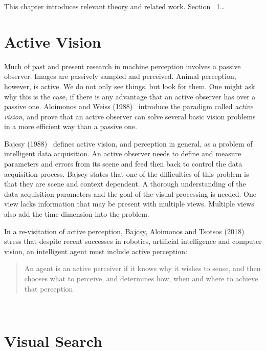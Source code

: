 This chapter introduces relevant theory and related work.
Section ~\ref{}\dots

\section{Active Vision}


Much of past and present research in machine perception involves a passive observer.
Images are passively sampled and perceived.
Animal perception, however, is active.
We do not only see things, but look for them.
One might ask why this is the case, if there is any advantage that an active observer has over a passive one.
Aloimonos and Weiss (1988)~\cite{aloimonos_active_1988} introduce the paradigm called \textit{active vision}, and prove that an active observer can solve several basic vision problems in a more efficient way than a passive one.

Bajcsy (1988)~\cite{bajcsy_1988} defines active vision, and perception in general, as a problem of intelligent data acquisition.
An active observer needs to define and measure parameters and errors from its scene and feed then back to control the data acquisition process.
Bajscy states that one of the difficulties of this problem is that they are scene and context dependent.
A thorough understanding of the data acquisition parameters and the goal of the visual processing is needed.
One view lacks information that may be present with multiple views.
Multiple views also add the time dimension into the problem.

In a re-visitation of active perception, Bajcsy, Aloimonos and Tsotsos (2018)~\cite{bajcsy_aloimonos_tsotsos_2018} stress that despite recent successes in robotics, artificial intelligence and computer vision, an intelligent agent must include active perception:

\begin{quote}
    An agent is an active perceiver if it knows why it wishes to sense, and then chooses what to perceive, and determines how, when and where to achieve that perception
\end{quote}~\cite{bajcsy_aloimonos_tsotsos_2018}


\section{Visual Search}
\label{sec:visualsearch}

